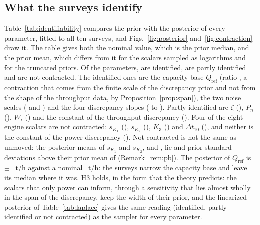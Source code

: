 \documentclass[journal]{IEEEtran}
\begin{document}
\subsection{What the surveys identify}

Table~\ref{tab:identifiability} compares the prior with the posterior of every parameter, fitted to all ten surveys, and
Figs.~\ref{fig:posterior} and~\ref{fig:contraction} draw it. The table gives both the nominal value, which is the prior
median, and the prior mean, which differs from it for the scalars sampled as logarithms and for the truncated priors. Of
the \nParams{} parameters, \nIdent{} are identified, \nPart{} are partly identified and \nNone{} are not contracted. The
identified ones are the capacity base $Q_{\mathrm{ref}}$ (ratio \qRefContr, a contraction that comes from the finite scale of
the discrepancy prior and not from the shape of the throughput data, by Proposition~\ref{prop:span}), the two noise scales (\sigTphContr{} and
\sigKwContr) and the four discrepancy slopes (\dTphFContr{} to \dKwCssContr). Partly identified are $\zeta$ (\zetaContr),
$P_n$ (\pnContr), $W_i$ (\wiContr) and the constant of the throughput discrepancy (\dTphConstContr). Four of the eight engine
scalars are not contracted: $s_{K_1}$ (\kOneScaleContr), $s_{K_2}$ (\kTwoScaleContr), $K_3$ (\kThreeContr) and
$\Delta t_{10}$ (\tShiftContr), and neither is the constant of the power discrepancy (\dKwConstContr). Not contracted is not
the same as unmoved: the posterior means of $s_{K_1}$ and $s_{K_2}$, \kOneScaleMean{} and \kTwoScaleMean, lie
\shiftKOneMain{} and \shiftKTwoMain{} prior standard deviations above their prior mean of \pmKOne{} (Remark~\ref{rem:pb}). The
posterior of $Q_{\mathrm{ref}}$ is \qRefMean{} $\pm$ \qRefSd~t/h against a nominal \qRefNominal~t/h: the surveys narrow the
capacity base and leave its median where it was. H3 holds, in the form that the theory predicts: the scalars that only
power can inform, through a sensitivity that lies almost wholly in the span of the discrepancy, keep the width of their
prior, and the linearized posterior of Table~\ref{tab:laplace} gives the same reading (identified, partly identified or not
contracted) as the sampler for every parameter.
\end{document}
